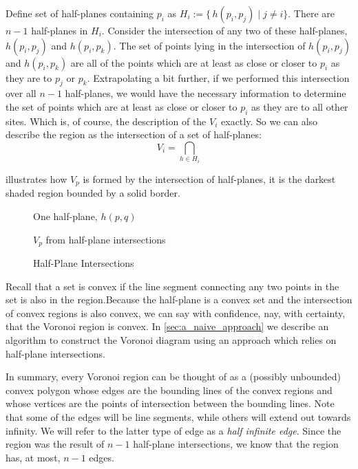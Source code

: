 \documentclass[12pt,twoside]{reedthesis}
\begin{document}
    Define set of half-planes containing $p_{i}$ as $H_{i} := \{\,h(p_{i}, p_{j}) \mid j\neq i \}$. There are $n-1$ half-planes in $H_{i}$. Consider the intersection of any two of these half-planes, $h(p_{i}, p_{j})$ and $h(p_{i}, p_{k})$. The set of points lying in the intersection of $h(p_{i}, p_{j})$ and $h(p_{i}, p_{k})$ are all of the points which are at least as close or closer to $p_{i}$ as they are to $p_{j}$ or $p_{k}$. Extrapolating a bit further, if we performed this intersection over all $n-1$ half-planes, we would have the necessary information to determine the set of points which are at least as close or closer to $p_{i}$ as they are to all other sites. Which is, of course, the description of the $V_{i}$ exactly. So we can also describe the region as the intersection of a set of half-planes:
    $$V_{i} = \bigcap_{h \in H_{i}}$$ 

     illustrates how $V_{p}$ is formed by the intersection of half-planes, it is the darkest shaded region bounded by a solid border.

    \begin{figure}[!htb]
      \centering
      \begin{subtable}{.475\textwidth}
        
        \caption{One half-plane, $h(p, q)$}
        \label{fig:one_half_plane}
      \end{subtable}%
      \begin{subtable}{.475\textwidth}
      \centering
        
        \caption{$V_{p}$ from half-plane intersections}
        \label{fig:all_half_planes}
      \end{subtable}
      \caption{Half-Plane Intersections}
      \label{fig:half_planes}
    \end{figure}
    Recall that a set is convex if the line segment connecting any two points in the set is also in the region.Because the half-plane is a convex set and the intersection of convex regions is also convex, we can say with confidence, nay, with certainty, that the Voronoi region is convex. In \cref{sec:a_naive_approach} we describe an algorithm to construct the Voronoi diagram using an approach which relies on half-plane intersections.\par

    In summary, every Voronoi region can be thought of as a (possibly unbounded) convex polygon whose edges are the bounding lines of the convex regions and whose vertices are the points of intersection between the bounding lines. Note that some of the edges will be line segments, while others will extend out towards infinity. We will refer to the latter type of edge as a \emph{half infinite edge}. Since the region was the result of $n-1$ half-plane intersections, we know that the region has, at most, $n-1$ edges. 
\end{document}

